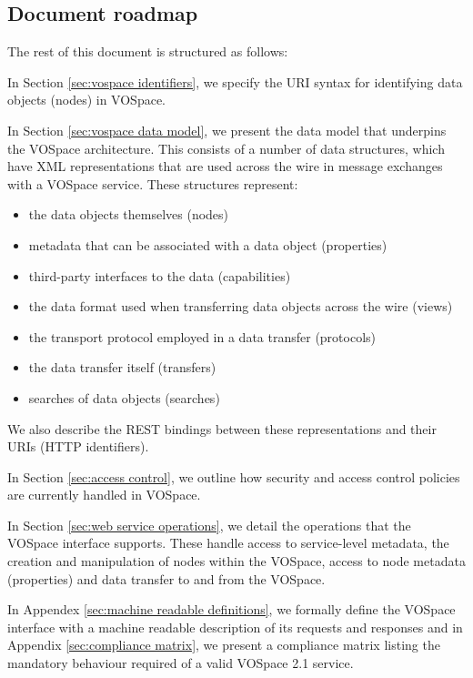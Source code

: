 \documentclass[11pt,a4paper]{ivoa}
\begin{document}
\subsection{Document roadmap}
\label{subsec:document roadmap}
The rest of this document is structured as follows:

In Section \ref{sec:vospace identifiers}, we specify the URI syntax for identifying data objects (nodes) in VOSpace.

In Section \ref{sec:vospace data model}, we present the data model that underpins the VOSpace architecture. This consists of a number of data structures, which have XML representations that are used across the wire in message exchanges with a VOSpace service. These structures represent:

\begin{itemize}
    \item the data objects themselves (nodes)
    \item metadata that can be associated with a data object (properties)
    \item third-party interfaces to the data (capabilities)
    \item the data format used when transferring data objects across the wire (views)
    \item the transport protocol employed in a data transfer (protocols)
    \item the data transfer itself (transfers)
    \item searches of data objects (searches)
\end{itemize}

We also describe the REST bindings between these representations and their URIs (HTTP identifiers).

In Section \ref{sec:access control}, we outline how security and access control policies are currently handled in VOSpace.

In Section \ref{sec:web service operations}, we detail the operations that the VOSpace interface supports. These handle access to service-level metadata, the creation and manipulation of nodes within the VOSpace, access to node metadata (properties) and data transfer to and from the VOSpace.

In Appendex \ref{sec:machine readable definitions}, we formally define the VOSpace interface with a machine readable description of its requests and responses and in Appendix \ref{sec:compliance matrix}, we present a compliance matrix listing the mandatory behaviour required of a valid VOSpace 2.1 service.
\end{document}
